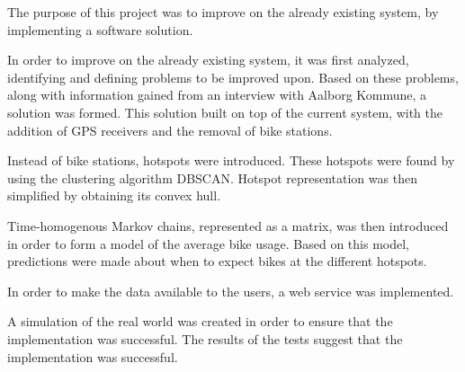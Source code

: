 The purpose of this project was to improve on the already existing \citybike system, by implementing a software solution.

In order to improve on the already existing \citybike system, it was first analyzed, identifying and defining problems to be improved upon.
Based on these problems, along with information gained from an interview with Aalborg Kommune, a solution was formed.
This solution built on top of the current \citybike system, with the addition of GPS receivers and the removal of bike stations.

Instead of bike stations, hotspots were introduced.
These hotspots were found by using the clustering algorithm DBSCAN.
Hotspot representation was then simplified by obtaining its convex hull.

Time-homogenous Markov chains, represented as a matrix, was then introduced in order to form a model of the average bike usage.
Based on this model, predictions were made about when to expect bikes at the different hotspots.

In order to make the data available to the users, a web service was implemented.

A simulation of the real world was created in order to ensure that the implementation was successful.
The results of the tests suggest that the implementation was successful.